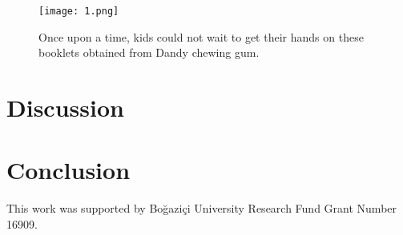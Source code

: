 \documentclass[
]{ceurart}
\begin{document}
\begin{figure}[tbh]
\centering
\texttt{[image: 1.png]}
\caption{Once upon a time, kids could not wait to get their hands on these booklets obtained from Dandy chewing gum.}
\label{fig:demo-fig}
\end{figure}

\section{Discussion}
\label{sec:discussion}


\section{Conclusion}
\label{sec:conclusion}

\begin{acknowledgments}
This work was supported by Boğaziçi University Research Fund Grant Number 16909.
\end{acknowledgments}


\end{document}
